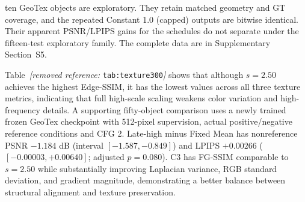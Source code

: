 \documentclass[times,twocolumn,final]{elsarticle}
\providecommand{\DIFadd}[1]{{\protect\color{blue} \sf #1}} %
\providecommand{\DIFdel}[1]{{\protect\color{red} \scriptsize #1}} %
\providecommand{\DIFaddbegin}{} %
\providecommand{\DIFaddend}{} %
\providecommand{\DIFdelbegin}{} %
\providecommand{\DIFdelend}{} %
\begin{document}
\DIFdelend \DIFaddbegin \DIFadd{ten GeoTex objects are exploratory. They retain matched geometry and GT coverage, and the repeated Constant 1.0 (capped) outputs are bitwise identical. Their apparent PSNR/LPIPS gains for the schedules do not separate under the fifteen-test exploratory family. The complete data are in Supplementary Section~S5.
}\DIFaddend 

\DIFdelbegin \DIFdel{Table~\textit{[removed reference: }\texttt{tab:texture300}\textit{]} shows that although $s = 2.50$ achieves the highest Edge-SSIM, it has the lowest values across all three texture metrics, indicating that full high-scale scaling weakens color variation and high-frequency details. }\DIFdelend \DIFaddbegin \DIFadd{A supporting fifty-object comparison uses a newly trained frozen GeoTex checkpoint with 512-pixel supervision, actual positive/negative reference conditions and CFG 2. Late-high minus Fixed Mean has nonreference PSNR $-1.184$ dB (interval $[-1.587,-0.849]$) and LPIPS $+0.00266$ ($[-0.00003,+0.00640]$; adjusted $p=0.080$). }\DIFaddend C3 \DIFdelbegin \DIFdel{has FG-SSIM comparable to $s = 2.50$ while substantially improving Laplacian variance, RGB standard deviation, and gradient magnitude, demonstrating a better balance between structural alignment and texture preservation. }%
\end{document}
